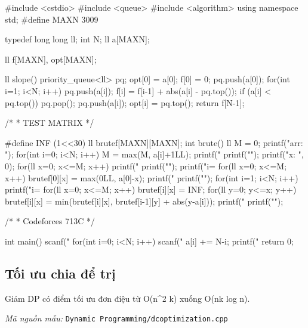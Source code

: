 \documentclass[11pt]{article}
\newcommand{\codepath}[1]{\par\noindent\textit{Mã nguồn mẫu:} \texttt{#1}\par}
\begin{document}
\begingroup\scriptsize
\begin{vncode}
#include <cstdio>
#include <queue>
#include <algorithm>
using namespace std;
#define MAXN 3009

typedef long long ll;
int N;
ll a[MAXN];

ll f[MAXN], opt[MAXN];

ll slope() {
    priority_queue<ll> pq;
    opt[0] = a[0]; f[0] = 0;
    pq.push(a[0]);
    for(int i=1; i<N; i++) {
        pq.push(a[i]);
        f[i] = f[i-1] + abs(a[i] - pq.top());
        if (a[i] < pq.top()) {
            pq.pop();
            pq.push(a[i]);
        }
        opt[i] = pq.top();
    }
    return f[N-1];
}

/*
 *  TEST MATRIX
 */

#define INF (1<<30)
ll brutef[MAXN][MAXN];
int brute() {
    ll M = 0;
    printf("arr: ");
    for(int i=0; i<N; i++) {
        M = max(M, a[i]+1LL);
        printf(" %
    }
    printf("\n");
    printf("x:   ", 0);
    for(ll x=0; x<=M; x++) {
        printf(" %
    }
    printf("\n");
    printf("i=%
    for(ll x=0; x<=M; x++) {
        brutef[0][x] = max(0LL, a[0]-x);
        printf(" %
    }
    printf("\n");
    for(int i=1; i<N; i++) {
        printf("i=%
        for(ll x=0; x<=M; x++) {
            brutef[i][x] = INF;
            for(ll y=0; y<=x; y++) {
                brutef[i][x] = min(brutef[i][x], brutef[i-1][y] + abs(y-a[i]));
            }
            printf(" %
        }
        printf("\n");
    }
}

/*
 *  Codeforces 713C
 */

int main() {
    scanf("%
    for(int i=0; i<N; i++) {
        scanf("%
        a[i] += N-i;
    }
    printf("%
    return 0;
}
\end{vncode}
\endgroup


\subsection{Tối ưu chia để trị}

Giảm DP có điểm tối ưu đơn điệu từ O(n\textasciicircum{}2 k) xuống O(nk log n).

\codepath{Dynamic Programming/dcoptimization.cpp}
\end{document}
